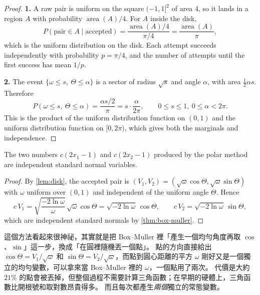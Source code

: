 \begin{proof}
	\textbf{1.} A raw pair is uniform on the square $(-1,1]^{2}$ of area $4$, so it lands in a region $A$ with probability $\operatorname{area}(A)/4$.
	For $A$ inside the disk,
	\[
		P(\text{pair}\in A\mid\text{accepted})=\frac{\operatorname{area}(A)/4}{\pi/4}=\frac{\operatorname{area}(A)}{\pi} ,
	\]
	which is the uniform distribution on the disk.
	Each attempt succeeds independently with probability $p=\pi/4$, and the number of attempts until the first success has mean $1/p$.

	\textbf{2.} The event $\{\omega\le s,\ \Theta\le\alpha\}$ is a sector of radius $\sqrt{s}$ and angle $\alpha$, with area $\tfrac12\alpha s$.
	Therefore
	\[
		P(\omega\le s,\ \Theta\le\alpha)=\frac{\alpha s/2}{\pi}=s\cdot\frac{\alpha}{2\pi} ,
		\qquad 0\le s\le1,\ 0\le\alpha<2\pi .
	\]
	This is the product of the uniform distribution function on $(0,1)$ and the uniform distribution function on $[0,2\pi)$, which gives both the marginals and independence.
\end{proof}

\begin{theorem}
	The two numbers $c(2x_{1}-1)$ and $c(2x_{2}-1)$ produced by the polar method are independent standard normal variables.
\end{theorem}

\begin{proof}
	By \autoref{lem:disk}, the accepted pair is $(V_{1},V_{2})=(\sqrt{\omega}\cos\Theta,\sqrt{\omega}\sin\Theta)$ with $\omega$ uniform over $(0,1)$ and independent of the uniform angle $\Theta$.
	Hence
	\[
		c\,V_{1}=\sqrt{\frac{-2\ln\omega}{\omega}}\,\sqrt{\omega}\cos\Theta=\sqrt{-2\ln\omega}\,\cos\Theta ,
		\qquad
		c\,V_{2}=\sqrt{-2\ln\omega}\,\sin\Theta ,
	\]
	which are independent standard normals by \autoref{thm:box-muller}.
\end{proof}

\begin{remark}
	這個方法看起來很神祕，其實就是把 Box--Muller 裡「產生一個均勻角度再取 $\cos$、$\sin$」這一步，換成「在圓裡隨機丟一個點」。
	點的方向直接給出 $\cos\Theta=V_{1}/\sqrt{\omega}$ 和 $\sin\Theta=V_{2}/\sqrt{\omega}$，而點到圓心距離的平方 $\omega$ 剛好又是一個獨立的均勻變數，可以拿來當 Box--Muller 裡的 $\omega$，一個點用了兩次。
	代價是大約 $21\%$ 的點會被丟掉，但整個過程不需要計算三角函數；在早期的硬體上，三角函數比開根號和取對數昂貴得多。
	而且每次都產生\emph{兩個}獨立的常態變數。
\end{remark}
\suppend

